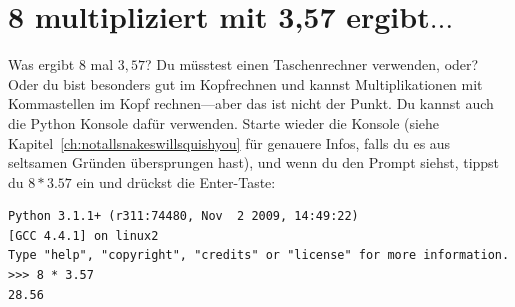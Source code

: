 

\chapter{8 multipliziert mit 3,57 ergibt$\ldots$}\label{ch:8multipliedby3.57}

Was ergibt $8$ mal $3,57$?  Du müsstest einen Taschenrechner verwenden, oder? Oder du bist besonders gut im Kopfrechnen und kannst Multiplikationen mit Kommastellen im Kopf rechnen---aber das ist nicht der Punkt. Du kannst auch die Python Konsole dafür verwenden. Starte wieder die Konsole (siehe Kapitel~\ref{ch:notallsnakeswillsquishyou} für genauere Infos, falls du es aus seltsamen Gründen übersprungen hast), und wenn du den Prompt siehst, tippst du $8 * 3.57$ ein und drückst die Enter-Taste:


\begin{Verbatim}[frame=single]
Python 3.1.1+ (r311:74480, Nov  2 2009, 14:49:22)
[GCC 4.4.1] on linux2
Type "help", "copyright", "credits" or "license" for more information.
>>> 8 * 3.57
28.56
\end{Verbatim}

